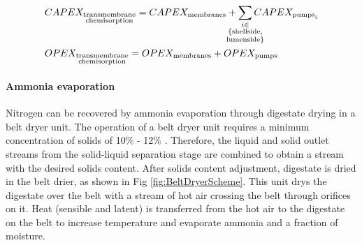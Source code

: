 \begin{refsection}[referencesCh6]
\begin{align}	
	& CAPEX_{\substack{\text{transmembrane} \\ \text{chemisorption}}}	= CAPEX_{\text{membranes}} + \sum_{\mathclap{\substack{i 
				\in \\
				\{\text{shellside,} \\ 
				\text{lumenside}\}}}} CAPEX_{\text{pumps}_i} \label{eq:CAPEX_Transmem}
	\\
	& OPEX_{\substack{\text{transmembrane} \\ \text{chemisorption}}}	= OPEX_{\text{membranes}} + OPEX_{\text{pumps}} \label{eq:OPEX_Transmem}
\end{align}	


\paragraph{\textbf{Ammonia evaporation}} \label{section:Digestate dryingNrecovery}
Nitrogen can be recovered by ammonia evaporation through digestate drying in a belt dryer unit. The operation of a belt dryer unit requires a minimum concentration of solids of 10\% - 12\% \citep{bolzonella2018nutrients}. Therefore, the liquid and solid outlet streams from the solid-liquid separation stage are combined to obtain a stream with the desired solids content. After solids content adjustment, digestate is dried in the belt drier, as shown in Fig \ref{fig:BeltDryerScheme}. This unit drys the digestate over the belt with a stream of hot air crossing the belt through orifices on it. Heat (sensible and latent) is transferred from the hot air to the digestate on the belt
to increase temperature
and evaporate
ammonia and a fraction of moisture.



\end{refsection}
